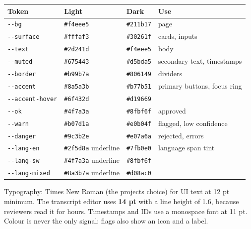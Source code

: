 \documentclass[11pt]{article}
\begin{document}
\begin{longtable}[]{@{}>{\raggedright\arraybackslash}p{}>{\raggedright\arraybackslash}p{}>{\raggedright\arraybackslash}p{}>{\raggedright\arraybackslash}p{}@{}}
\toprule\noalign{}
Token & Light & Dark & Use \\
\midrule\noalign{}
\endhead
\bottomrule\noalign{}
\endlastfoot
\texttt{-\allowbreak{}-\allowbreak{}bg} & \texttt{\#f4eee5} & \texttt{\#211b17} & page \\
\texttt{-\allowbreak{}-\allowbreak{}surface} & \texttt{\#fffaf3} & \texttt{\#30261f} & cards, inputs \\
\texttt{-\allowbreak{}-\allowbreak{}text} & \texttt{\#2d241d} & \texttt{\#f4eee5} & body \\
\texttt{-\allowbreak{}-\allowbreak{}muted} & \texttt{\#675443} & \texttt{\#d5bda5} & secondary text, timestamps \\
\texttt{-\allowbreak{}-\allowbreak{}border} & \texttt{\#b99b7a} & \texttt{\#806149} & dividers \\
\texttt{-\allowbreak{}-\allowbreak{}accent} & \texttt{\#8a5a3b} & \texttt{\#b77b51} & primary buttons, focus ring \\
\texttt{-\allowbreak{}-\allowbreak{}accent-\allowbreak{}hover} & \texttt{\#6f432d} & \texttt{\#d19669} & \\
\texttt{-\allowbreak{}-\allowbreak{}ok} & \texttt{\#4f7a3a} & \texttt{\#8fbf6f} & approved \\
\texttt{-\allowbreak{}-\allowbreak{}warn} & \texttt{\#b07d1a} & \texttt{\#e0b04f} & flagged, low confidence \\
\texttt{-\allowbreak{}-\allowbreak{}danger} & \texttt{\#9c3b2e} & \texttt{\#e07a6a} & rejected, errors \\
\texttt{-\allowbreak{}-\allowbreak{}lang-\allowbreak{}en} & \texttt{\#2f5d8a} underline & \texttt{\#7fb0e0} & language span tint \\
\texttt{-\allowbreak{}-\allowbreak{}lang-\allowbreak{}sw} & \texttt{\#4f7a3a} underline & \texttt{\#8fbf6f} & \\
\texttt{-\allowbreak{}-\allowbreak{}lang-\allowbreak{}mixed} & \texttt{\#8a3b7a} underline & \texttt{\#d08ac0} & \\
\end{longtable}

Typography: Times New Roman (the project\textquotesingle s choice) for UI text at 12 pt minimum. The transcript editor uses \textbf{14 pt} with a line height of 1.6, because reviewers read it for hours. Timestamps and IDs use a monospace font at 11 pt. Colour is never the only signal: flags also show an icon and a label.
\end{document}
